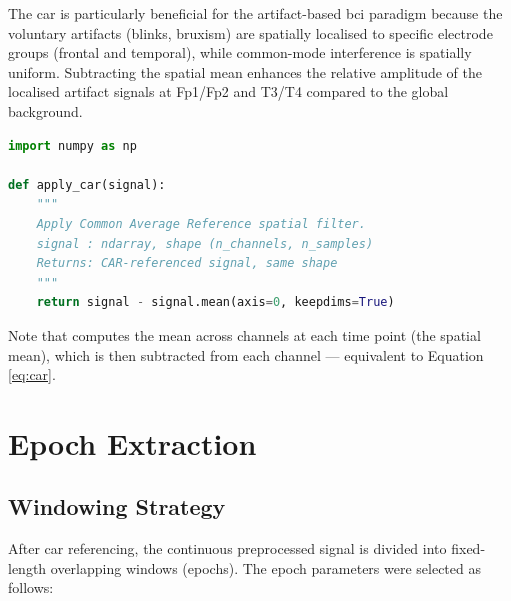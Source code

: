 The \acrshort{car} is particularly beneficial for the
artifact-based \acrshort{bci} paradigm because the voluntary
artifacts (blinks, bruxism) are spatially localised to specific
electrode groups (frontal and temporal), while common-mode
interference is spatially uniform. Subtracting the spatial
mean enhances the relative amplitude of the localised artifact
signals at Fp1/Fp2 and T3/T4 compared to the global background.

\begin{lstlisting}[language=Python,
    caption={Common Average Reference implementation.},
    label={lst:car}]
import numpy as np

def apply_car(signal):
    """
    Apply Common Average Reference spatial filter.
    signal : ndarray, shape (n_channels, n_samples)
    Returns: CAR-referenced signal, same shape
    """
    return signal - signal.mean(axis=0, keepdims=True)
\end{lstlisting}

Note that  computes the mean across
channels at each time point (the spatial mean), which is then
subtracted from each channel — equivalent to Equation
\eqref{eq:car}.

\section{Epoch Extraction}
\label{sec:sp_epoch}

\subsection{Windowing Strategy}

After \acrshort{car} referencing, the continuous preprocessed
signal is divided into fixed-length overlapping windows
(epochs). The epoch parameters were selected as follows:

